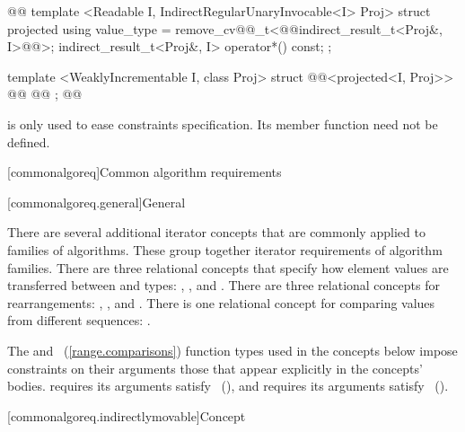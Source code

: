 %
\begin{codeblock}
@@
  template <Readable I, IndirectRegularUnaryInvocable<I> Proj>
  struct projected {
    using value_type = remove_cv@@_t<@@indirect_result_t<Proj&, I>@\removed{>}@>;
    indirect_result_t<Proj&, I> operator*() const;
  };

  template <WeaklyIncrementable I, class Proj>
  struct @@<projected<I, Proj>> {
    @@
    @@
  };
@\added{\}}@
\end{codeblock}

\pnum
\enternote {} is only used to ease constraints specification. Its
member function need not be defined.\exitnote




[commonalgoreq]{Common algorithm requirements}

[commonalgoreq.general]{General}

\pnum
There are several additional iterator concepts that are commonly applied to families of algorithms.
These group together iterator requirements of algorithm families. There are three relational
concepts that specify how element values are transferred between  and  types:
, , and . There are three relational concepts
for rearrangements: , , and .
There is one relational concept for comparing values from different sequences: .

\pnum
\enternote The  and ~(\ref{range.comparisons}) function  types used in the
concepts below impose  constraints on their arguments  those that appear explicitly in the
concepts' bodies.  requires its arguments satisfy ~(),
and  requires its arguments satisfy ~().\exitnote

[commonalgoreq.indirectlymovable]{Concept }

